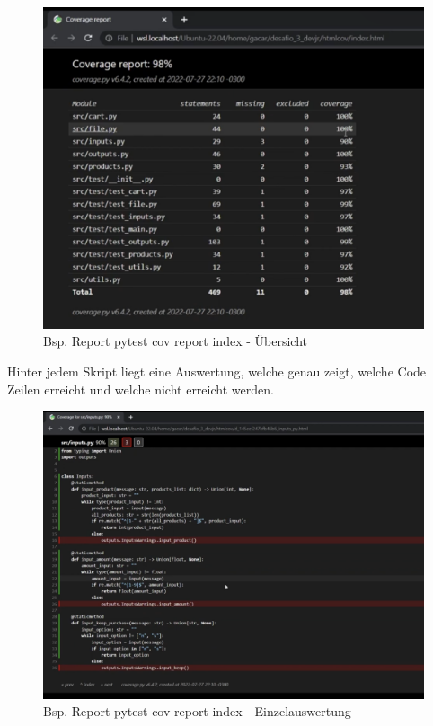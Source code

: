 \begin{figure}[H]
	\centering
	\includegraphics[scale = 0.6]{attachment/chapter_2/Scc096}
	\caption{Bsp. Report pytest cov report index - Übersicht}
\end{figure}
Hinter jedem Skript liegt eine Auswertung, welche genau zeigt, welche Code Zeilen erreicht und welche nicht erreicht werden.
\begin{figure}[H]
	\centering
	\includegraphics[scale = 0.6]{attachment/chapter_2/Scc097}
	\caption{Bsp. Report pytest cov report index - Einzelauswertung}
\end{figure}

